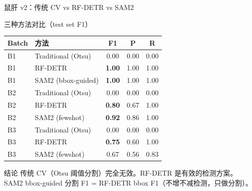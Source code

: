 \documentclass[aspectratio=169, 10pt]{beamer}
\begin{document}
\begin{frame}{鼠肝 v2：传统 CV vs RF-DETR vs SAM2}
  \begin{block}{三种方法对比（test set F1）}
    \begin{tabular}{llccc}
      \toprule
      \textbf{Batch} & \textbf{方法} & \textbf{F1} & \textbf{P} & \textbf{R} \\
      \midrule
      B1 & Traditional (Otsu) & 0.00 & 0.00 & 0.00 \\
      B1 & RF-DETR & \textbf{1.00} & 1.00 & 1.00 \\
      B1 & SAM2 (bbox-guided) & \textbf{1.00} & 1.00 & 1.00 \\
      \midrule
      B2 & Traditional (Otsu) & 0.00 & 0.00 & 0.00 \\
      B2 & RF-DETR & \textbf{0.80} & 0.67 & 1.00 \\
      B2 & SAM2 (fewshot) & \textbf{0.92} & 0.86 & 1.00 \\
      \midrule
      B3 & Traditional (Otsu) & 0.00 & 0.00 & 0.00 \\
      B3 & RF-DETR & \textbf{0.75} & 0.60 & 1.00 \\
      B3 & SAM2 (fewshot) & 0.67 & 0.56 & 0.83 \\
      \bottomrule
    \end{tabular}
  \end{block}
  \vspace{0em}
  \begin{alertblock}{结论}
    传统 CV（Otsu 阈值分割）完全无效。RF-DETR 是有效的检测方案。SAM2 bbox-guided 分割 F1 = RF-DETR bbox F1（不增不减检测，只做分割）。
  \end{alertblock}
\end{frame}
\end{document}
